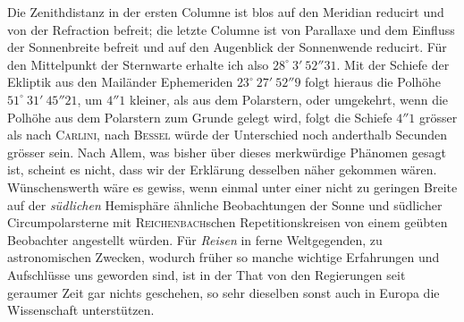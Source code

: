 \par\indent Die Zenithdistanz in der ersten Columne ist blos auf den Meridian reducirt und von der
Refraction befreit; die letzte Columne ist von Parallaxe und dem Einfluss der Sonnenbreite
befreit und auf den Augenblick der Sonnenwende reducirt. Für den Mittelpunkt der Sternwarte
erhalte ich also $28^\circ\ 3'\ 52''31$. Mit der Schiefe der Ekliptik aus den Mailänder
Ephemeriden $23^\circ\ 27'\ 52''9$ folgt hieraus die Polhöhe $51^\circ\ 31'\ 45''21$, um $4''1$
kleiner, als aus dem Polarstern, oder umgekehrt, wenn die Polhöhe aus dem Polarstern zum Grunde
gelegt wird, folgt die Schiefe $4''1$ grösser als nach \textsc{Carlini}, nach \textsc{Bessel}
würde der Unterschied noch anderthalb Secunden grösser sein. Nach Allem, was bisher über dieses  merkwürdige Phänomen gesagt ist, scheint es nicht, dass wir der Erklärung
desselben näher gekommen wären. Wünschenswerth wäre es gewiss, wenn einmal
unter einer nicht zu geringen Breite auf der \emph{südlichen} Hemisphäre
ähnliche Beobachtungen der Sonne und südlicher Circumpolarsterne mit
\textsc{Reichenbach}schen Repetitionskreisen von einem geübten Beobachter
angestellt würden. Für \emph{Reisen} in ferne Weltgegenden, zu astronomischen
Zwecken, wodurch früher so manche wichtige Erfahrungen und Aufschlüsse uns
geworden sind, ist in der That von den Regierungen seit geraumer Zeit gar
nichts geschehen, so sehr dieselben sonst auch in Europa die Wissenschaft
unterstützen.

